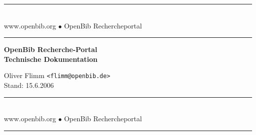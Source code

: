 \documentclass[11pt, twoside, a4paper, BCOR8mm, DIV12, bibtotoc,idxtotoc]{scrbook}
\begin{document}
\frontmatter

\begin{titlepage}

\begin{center}
\rule[-.1in]{16cm}{1mm}\\[3mm]
{\fontsize{20}{20pt}\selectfont
  www.openbib.org $\bullet$ OpenBib Rechercheportal}\\[-2mm]
\rule[-.1in]{16cm}{1mm}

\vspace{5cm}

  \textbf{\fontsize{30}{30pt}\selectfont OpenBib Recherche-Portal\\[3mm] Technische Dokumentation}

  \vspace{2cm}

  Oliver Flimm \texttt{<flimm@openbib.de>}\\
  Stand: 15.6.2006

  \vspace{8cm}

\rule[-.1in]{16cm}{1mm}\\[3mm]
{\fontsize{20}{20pt}\selectfont
  www.openbib.org $\bullet$ OpenBib Rechercheportal}\\[-2mm]
\rule[-.1in]{16cm}{1mm}

\end{center}

\end{titlepage}






\tableofcontents
\end{document}

